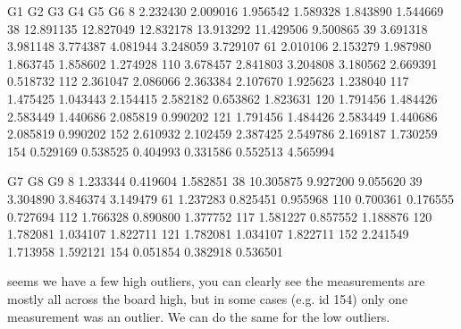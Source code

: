 \documentclass[letterpaper,10pt,english]{jupyterBook}
\begin{document}
\begin{sphinxVerbatim}[commandchars=\\\{\}]
            G1         G2         G3         G4         G5        G6  \PYGZbs{}
8     2.232430   2.009016   1.956542   1.589328   1.843890  1.544669   
38   12.891135  12.827049  12.832178  13.913292  11.429506  9.500865   
39    3.691318   3.981148   3.774387   4.081944   3.248059  3.729107   
61    2.010106   2.153279   1.987980   1.863745   1.858602  1.274928   
110   3.678457   2.841803   3.204808   3.180562   2.669391  0.518732   
112   2.361047   2.086066   2.363384   2.107670   1.925623  1.238040   
117   1.475425   1.043443   2.154415   2.582182   0.653862  1.823631   
120   1.791456   1.484426   2.583449   1.440686   2.085819  0.990202   
121   1.791456   1.484426   2.583449   1.440686   2.085819  0.990202   
152   2.610932   2.102459   2.387425   2.549786   2.169187  1.730259   
154  \PYGZhy{}0.529169  \PYGZhy{}0.538525  \PYGZhy{}0.404993  \PYGZhy{}0.331586  \PYGZhy{}0.552513  4.565994   

            G7        G8        G9  
8     1.233344  0.419604  1.582851  
38   10.305875  9.927200  9.055620  
39    3.304890  3.846374  3.149479  
61    1.237283  0.825451  0.955968  
110   0.700361  0.176555  0.727694  
112   1.766328  0.890800  1.377752  
117   1.581227  0.857552  1.188876  
120   1.782081  1.034107  1.822711  
121   1.782081  1.034107  1.822711  
152   2.241549  1.713958  1.592121  
154  \PYGZhy{}0.051854 \PYGZhy{}0.382918 \PYGZhy{}0.536501  
\end{sphinxVerbatim}

\sphinxAtStartPar
seems we have a few high outliers, you can clearly see the measurements are mostly all across the board high, but in some cases (e.g. id 154) only one measurement was an outlier.
We can do the same for the low outliers.

\begin{sphinxVerbatim}[commandchars=\\\{\}]
\PYG{p}{[}\PYG{p}{]}
\end{sphinxVerbatim}
\end{document}
